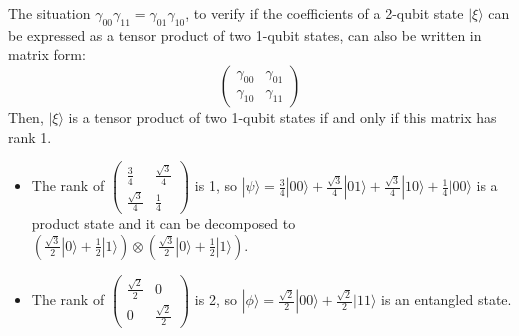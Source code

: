 \begin{example}
   The situation $\gamma_{00} \gamma_{11}=\gamma_{01} \gamma_{10}$, to verify if the coefficients of a 2-qubit state $|\xi\rangle$ can be expressed as a tensor product of two 1-qubit states, can also be written in matrix form:
	\begin{equation}
    \left(\begin{array}{ll}
		\gamma_{00} & \gamma_{01} \\
		\gamma_{10} & \gamma_{11}
	\end{array}\right)
\end{equation}
	Then, $|\xi\rangle$ is a tensor product of two 1-qubit states if and only if this matrix has rank 1.

    \begin{itemize}
    \item The rank of $\left(\begin{array}{cc}\frac{3}{4} & \frac{\sqrt{3}}{4} \\ \frac{\sqrt{3}}{4} & \frac{1}{4}\end{array}\right)$ is 1, so $|\psi\rangle =\frac{3}{4}|00\rangle+\frac{\sqrt{3}}{4}|01\rangle+\frac{\sqrt{3}}{4}|10\rangle+\frac{1}{4}|00\rangle$ is a product state and it can be decomposed to $\left(\frac{\sqrt{3}}{2}|0\rangle+\frac{1}{2}|1\rangle\right)\otimes\left(\frac{\sqrt{3}}{2}|0\rangle+\frac{1}{2}|1\rangle\right)$.
    \item The rank of $\left(\begin{array}{cc}\frac{\sqrt{2}}{2} & 0 \\ 0 & \frac{\sqrt{2}}{2}\end{array}\right)$ is 2, so $|\phi\rangle=\frac{\sqrt{2}}{2}|00\rangle+\frac{\sqrt{2}}{2}|11\rangle$ is an entangled state.
    \end{itemize}
\end{example}
